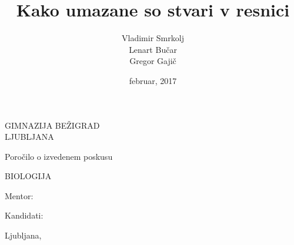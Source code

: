 \documentclass[12pt, a4paper]{report}
\begin{document}
\title{Kako umazane so stvari v resnici}
\author{Vladimir Smrkolj\\Lenart Bučar\\Gregor Gajič}
\date{februar, 2017}

\begin{titlepage}
\centering
{\sffamily

{\Large{GIMNAZIJA BEŽIGRAD\\[2mm]LJUBLJANA}}

\vspace{2.5cm}

{\large Poročilo o izvedenem poskusu

\vspace{1cm}

BIOLOGIJA
}

\vspace{2.5cm}

\makeatletter
{\LARGE{\textbf{\@title}}}
\makeatother


\vfill


\parbox{4cm}{Mentor:}
\hfill
\makeatletter
Kandidati: \parbox[t]{4cm}{\@author}
\makeatother

\vspace{2cm}

\makeatletter
Ljubljana, \@date
\makeatother
}
\end{titlepage}
\end{document}
